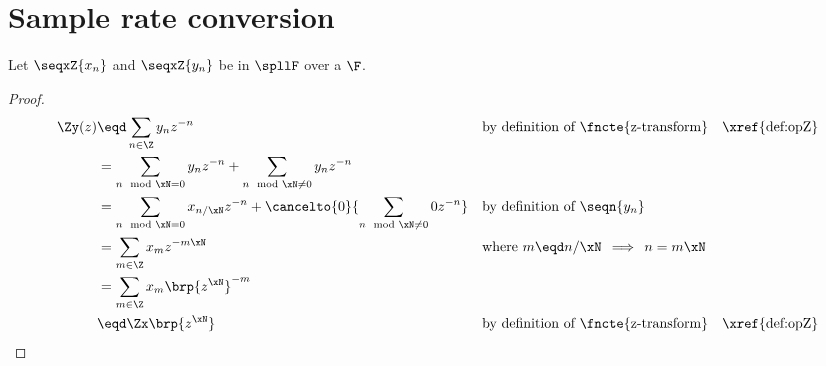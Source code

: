 \section{Sample rate conversion}
\begin{theorem}
\label{thm:upsample}
Let $\seqxZ{x_n}$ and $\seqxZ{y_n}$ be   
in $\spllF$  over a  $\F$.
\end{theorem}
\begin{proof}
\begin{align*}
  \Zy(z)
    &\eqd \sum_{n\in\Z} y_n z^{-n}
    &&    \text{by definition of \fncte{z-transform}}
    &&    \text{\xref{def:opZ}}
  \\&=    \sum_{n\mod\xN=0}   y_n z^{-n} +
          \sum_{n\mod\xN\ne0} y_n z^{-n}
  \\&=    \sum_{n\mod\xN=0} x_{n/\xN} z^{-n} +
          \cancelto{0}{\sum_{n\mod \xN\ne 0} 0 z^{-n}}
    &&    \text{by definition of $\seqn{y_n}$}
  \\&=    \sum_{m\in\Z} x_m z^{-m\xN}
    &&    \text{where $m\eqd n/\xN\,\implies\,n=m\xN$}
  \\&=    \sum_{m\in\Z} x_m \brp{z^\xN}^{-m}
  \\&\eqd \Zx\brp{z^\xN}
    &&    \text{by definition of \fncte{z-transform}}
    &&    \text{\xref{def:opZ}}
\end{align*}
\end{proof}



